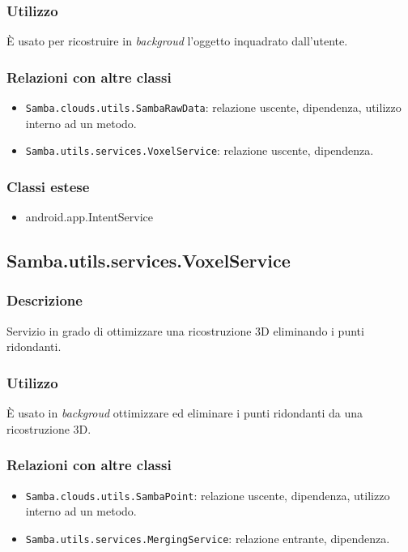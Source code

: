 \subsubsection{Utilizzo}
È usato per ricostruire in \emph{backgroud} l'oggetto inquadrato dall'utente.
\subsubsection{Relazioni con altre classi}
\begin{itemize}
	\item \texttt{Samba.clouds.utils.SambaRawData}: relazione uscente, dipendenza, utilizzo interno ad un metodo.
	\item \texttt{Samba.utils.services.VoxelService}: relazione uscente, dipendenza.
\end{itemize}
\subsubsection{Classi estese}
\begin{itemize}
	\item android.app.IntentService
\end{itemize}

\subsection{Samba.utils.services.VoxelService}
\subsubsection{Descrizione}
Servizio in grado di ottimizzare una ricostruzione 3D eliminando i punti ridondanti.
\subsubsection{Utilizzo}
È usato in \emph{backgroud} ottimizzare ed eliminare i punti ridondanti da una ricostruzione 3D.
\subsubsection{Relazioni con altre classi}
\begin{itemize}
	\item \texttt{Samba.clouds.utils.SambaPoint}: relazione uscente, dipendenza, utilizzo interno ad un metodo.
	\item \texttt{Samba.utils.services.MergingService}: relazione entrante, dipendenza.
\end{itemize}

